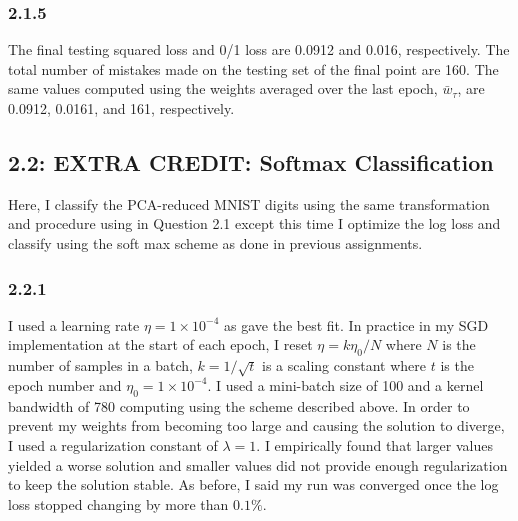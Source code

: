 \documentclass[12pt]{amsart}
\begin{document}
\subsubsection*{2.1.5}
The final testing squared loss and 0/1 loss are 0.0912 and 0.016, respectively.  The total number of mistakes made on the testing set of the final point are 160.  The same values computed using the weights averaged over the last epoch, $\bar{w}_{\tau}$, are 0.0912, 0.0161, and 161, respectively.

\subsection*{2.2: EXTRA CREDIT: Softmax Classification}
Here, I classify the PCA-reduced MNIST digits using the same transformation and procedure using in Question 2.1 except this time I optimize the log loss and classify using the soft max scheme as done in previous assignments.

\subsubsection*{2.2.1}
I used a learning rate $\eta = 1 \times 10^{-4}$ as gave the best fit.  In practice in my SGD implementation at the start of each epoch, I reset $\eta = k\eta_0/N$ where $N$ is the number of samples in a batch, $k = 1/\sqrt{t}$ is a scaling constant where $t$ is the epoch number and $\eta_0 = 1 \times 10^{-4}$.  I used a mini-batch size of 100 and a kernel bandwidth of 780 computing using the scheme described above.  In order to prevent my weights from becoming too large and causing the solution to diverge, I used a regularization constant of $\lambda = 1$.  I empirically found that larger values yielded a worse solution and smaller values did not provide enough regularization to keep the solution stable.  As before, I said my run was converged once the log loss stopped changing by more than $0.1\%$.
\end{document}
